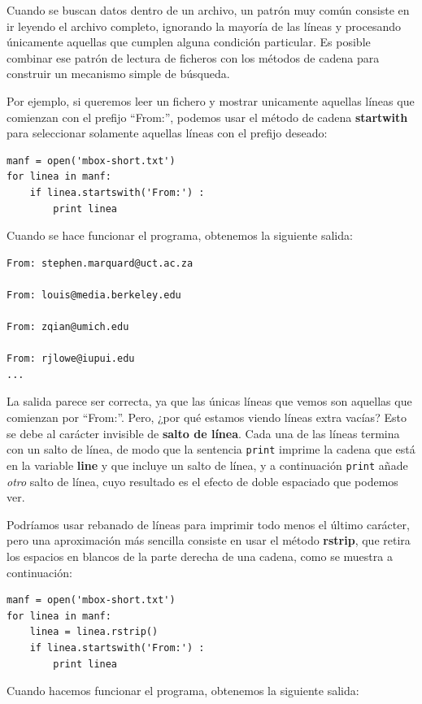 Cuando se buscan datos dentro de un archivo, un
patrón muy común consiste en ir leyendo el archivo completo, ignorando
la mayoría de las líneas y procesando únicamente aquellas que cumplen alguna condición
particular. Es posible combinar ese patrón de lectura de ficheros con los métodos de cadena
para construir un mecanismo simple de búsqueda.

Por ejemplo, si queremos leer un fichero y mostrar unicamente aquellas líneas
que comienzan con el prefijo ``From:'', podemos usar el
método de cadena {\bf startwith} para seleccionar solamente aquellas líneas con
el prefijo deseado:

\beforeverb
\begin{verbatim}
manf = open('mbox-short.txt')
for linea in manf:
    if linea.startswith('From:') :
        print linea
\end{verbatim}
\afterverb
%
Cuando se hace funcionar el programa, obtenemos la siguiente salida:

\beforeverb
\begin{verbatim}
From: stephen.marquard@uct.ac.za

From: louis@media.berkeley.edu

From: zqian@umich.edu

From: rjlowe@iupui.edu
...
\end{verbatim}
\afterverb
%
La salida parece ser correcta, ya que las únicas líneas que vemos son aquellas
que comienzan por ``From:''. Pero, ¿por qué estamos viendo líneas extra
vacías? Esto se debe al carácter invisible de {\bf salto de línea}.
Cada una de las líneas termina con un salto de línea, de modo que la sentencia
{\tt print} imprime la cadena que está en la variable {\bf line} y que
incluye un salto de línea, y a continuación {\tt print} añade \emph{otro} salto de línea,
cuyo resultado es el efecto de doble espaciado que podemos ver.

Podríamos usar rebanado de líneas para imprimir todo menos el último carácter, pero
una aproximación más sencilla consiste en usar el método {\bf rstrip}, que retira
los espacios en blancos de la parte derecha de una cadena, como se muestra a continuación:

\beforeverb
\begin{verbatim}
manf = open('mbox-short.txt')
for linea in manf:
    linea = linea.rstrip()
    if linea.startswith('From:') :
        print linea
\end{verbatim}
\afterverb
%
Cuando hacemos funcionar el programa, obtenemos la siguiente salida:

